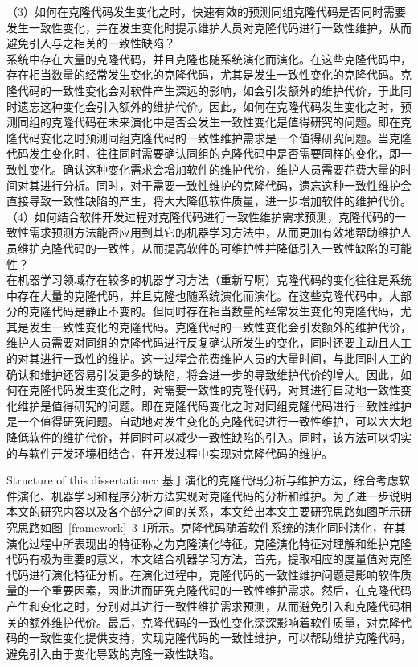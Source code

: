 （3）如何在克隆代码发生变化之时，快速有效的预测同组克隆代码是否同时需要发生一致性变化，并在发生变化时提示维护人员对克隆代码进行一致性维护，从而避免引入与之相关的一致性缺陷？\\

系统中存在大量的克隆代码，并且克隆也随系统演化而演化。在这些克隆代码中，存在相当数量的经常发生变化的克隆代码，尤其是发生一致性变化的克隆代码。克隆代码的一致性变化会对软件产生深远的影响，如会引发额外的维护代价，于此同时遗忘这种变化会引入额外的维护代价。因此，如何在克隆代码发生变化之时，预测同组的克隆代码在未来演化中是否会发生一致性变化是值得研究的问题。即在克隆代码变化之时预测同组克隆代码的一致性维护需求是一个值得研究问题。当克隆代码发生变化时，往往同时需要确认同组的克隆代码中是否需要同样的变化，即一致性变化。确认这种变化需求会增加软件的维护代价，维护人员需要花费大量的时间对其进行分析。同时，对于需要一致性维护的克隆代码，遗忘这种一致性维护会直接导致一致性缺陷的产生，将大大降低软件质量，进一步增加软件的维护代价。\\

（4）如何结合软件开发过程对克隆代码进行一致性维护需求预测，克隆代码的一致性需求预测方法能否应用到其它的机器学习方法中，从而更加有效地帮助维护人员维护克隆代码的一致性，从而提高软件的可维护性并降低引入一致性缺陷的可能性？\\

在机器学习领域存在较多的机器学习方法（重新写啊）克隆代码的变化往往是系统中存在大量的克隆代码，并且克隆也随系统演化而演化。在这些克隆代码中，大部分的克隆代码是静止不变的。但同时存在相当数量的经常发生变化的克隆代码，尤其是发生一致性变化的克隆代码。克隆代码的一致性变化会引发额外的维护代价，维护人员需要对同组的克隆代码进行反复确认所发生的变化，同时还要主动且人工的对其进行一致性的维护。这一过程会花费维护人员的大量时间，与此同时人工的确认和维护还容易引发更多的缺陷，将会进一步的导致维护代价的增大。因此，如何在克隆代码发生变化之时，对需要一致性的克隆代码，对其进行自动地一致性变化维护是值得研究的问题。即在克隆代码变化之时对同组克隆代码进行一致性维护是一个值得研究问题。自动地对发生变化的克隆代码进行一致性维护，可以大大地降低软件的维护代价，并同时可以减少一致性缺陷的引入。同时，该方法可以切实的与软件开发环境相结合，在开发过程中实现对克隆代码的维护。

{Structure of this dissertation}cc
基于演化的克隆代码分析与维护方法，综合考虑软件演化、机器学习和程序分析方法实现对克隆代码的分析和维护。为了进一步说明本文的研究内容以及各个部分之间的关系，本文给出本文主要研究思路如图所示研究思路如图~\ref{framework}~3-1所示。克隆代码随着软件系统的演化同时演化，在其演化过程中所表现出的特征称之为克隆演化特征。克隆演化特征对理解和维护克隆代码有极为重要的意义，本文结合机器学习方法，首先，提取相应的度量值对克隆代码进行演化特征分析。在演化过程中，克隆代码的一致性维护问题是影响软件质量的一个重要因素，因此进而研究克隆代码的一致性维护需求。然后，在克隆代码产生和变化之时，分别对其进行一致性维护需求预测，从而避免引入和克隆代码相关的额外维护代价。最后，克隆代码的一致性变化深深影响着软件质量，对克隆代码的一致性变化提供支持，实现克隆代码的一致性维护，可以帮助维护克隆代码，避免引入由于变化导致的克隆一致性缺陷。

